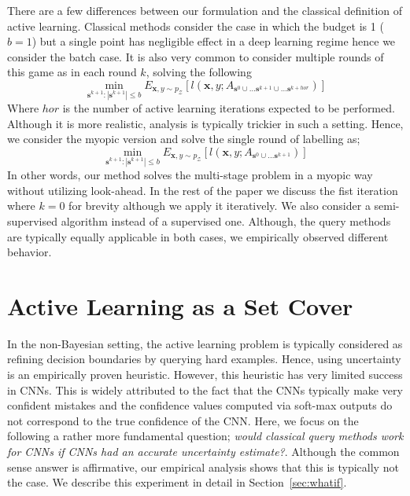 \documentclass{article}
\begin{document}
There are a few differences between our formulation and the classical definition of active learning. Classical methods consider the case in which the budget is 1 ($b=1$) but a single point has negligible effect in a deep learning regime hence we consider the batch case. It is also very common to consider multiple rounds of this game as in each round $k$, solving the following
\begin{equation}
\min_{\mathbf{s}^{k+1} : |\mathbf{s}^{k+1}| \leq b} E_{\mathbf{x},y \sim p_\mathcal{Z}} [l(\mathbf{x},y;A_{\mathbf{s}^{0} \cup \ldots  \mathbf{s}^{k+1} \cup \ldots  \mathbf{s}^{k+hor}})]
\end{equation}
Where $hor$ is the number of active learning iterations expected to be performed. Although it is more realistic, analysis is typically trickier in such a setting. Hence, we consider the myopic version and solve the single round of labelling as;
\begin{equation}
\min_{\mathbf{s}^{k+1} : |\mathbf{s}^{k+1}| \leq b} E_{\mathbf{x},y \sim p_\mathcal{Z}} [l(\mathbf{x},y;A_{\mathbf{s}^{0} \cup \ldots  \mathbf{s}^{k+1}})]
\end{equation}
In other words, our method solves the multi-stage problem in a myopic way without utilizing look-ahead. In the rest of the paper we discuss the fist iteration where $k=0$ for brevity although we apply it iteratively. We also consider a semi-supervised algorithm instead of a supervised one. Although, the query methods are typically equally applicable in both cases, we empirically observed different behavior. 

\section{Active Learning as a Set Cover}
In the non-Bayesian setting, the active learning problem is typically considered as refining decision boundaries by querying hard examples. Hence, using uncertainty is an empirically proven heuristic. However, this heuristic has very limited success in CNNs. This is widely attributed to the fact that the CNNs typically make very confident mistakes and the confidence values computed via soft-max outputs do not correspond to the true confidence of the CNN. Here, we focus on the following a rather more fundamental question; \emph{would classical query methods work for CNNs if CNNs had an accurate uncertainty estimate?}. Although the common sense answer is affirmative, our empirical analysis shows that this is typically not the case. We describe this experiment in detail in Section~\ref{sec:whatif}.
\end{document}
